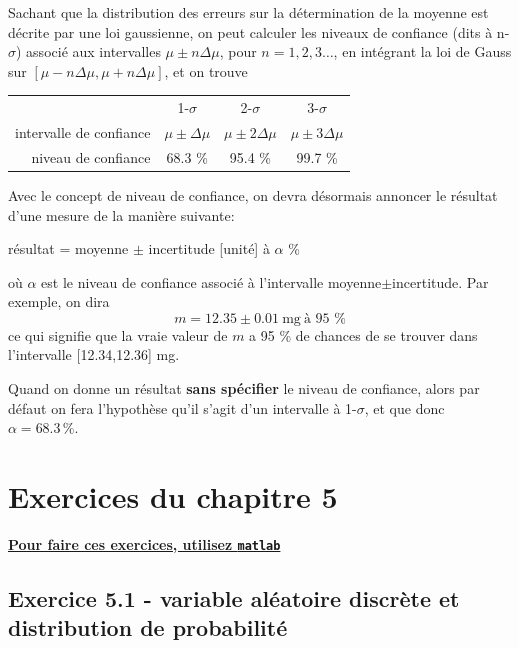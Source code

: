 \documentclass[main.tex]{subfiles}
\begin{document}
Sachant que la distribution des erreurs sur la détermination de la moyenne est décrite par une loi gaussienne, on peut calculer les niveaux de confiance (dits à n-$\sigma$) associé aux intervalles $\mu\pm n\Delta\mu$, pour $n=1,2,3\dots$, en intégrant la loi de Gauss sur $[\mu-n\Delta\mu,\mu+n\Delta\mu]$, et on trouve
\begin{center}
    \begin{tabular}{r|ccc}
                                & 1-$\sigma$        & 2-$\sigma$         & 3-$\sigma$         \\
        intervalle de confiance & $\mu\pm\Delta\mu$ & $\mu\pm2\Delta\mu$ & $\mu\pm3\Delta\mu$ \\
        niveau de confiance     & 68.3 \%           & 95.4 \%            & 99.7 \%
    \end{tabular}
\end{center}

Avec le concept de niveau de confiance, on devra désormais annoncer le résultat d'une mesure de la manière suivante:
\begin{center}
    résultat = moyenne $\pm$ incertitude [unité] à $\alpha$ \%
\end{center}
où $\alpha$ est le niveau de confiance associé à l'intervalle moyenne$\pm$incertitude. Par exemple, on dira
$$
    m=12.35\pm0.01\ \text{mg}\ \text{à 95 \%}
$$
ce qui signifie que la vraie valeur de $m$ a 95 \% de chances de se trouver dans l'intervalle [12.34,12.36] mg.

Quand on donne un résultat \textbf{sans spécifier} le niveau de confiance, alors par défaut on fera l'hypothèse qu'il s'agit d'un intervalle à 1-$\sigma$, et que donc $\alpha=68.3\,\%$.

\newpage

\section{Exercices du chapitre 5}

\begin{center}
    \Large \bf {\underline{Pour faire ces exercices, utilisez \texttt{matlab}}}
\end{center}

\subsection*{Exercice 5.1 - variable aléatoire discrète et distribution de probabilité}
\end{document}
